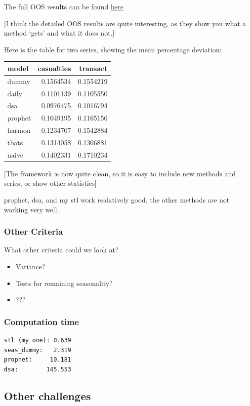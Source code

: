\documentclass[
]{article}
\begin{document}
The full OOS results can be found
\href{https://github.com/christophsax/x13book/blob/master/topics/dailyadj/vignettes/overview.md}{here}

{[}I think the detailed OOS results are quite interesting, as they show
you what a method `gets' and what it does not.{]}

Here is the table for two series, showing the mean percentage deviation:

\begin{longtable}[]{@{}lrr@{}}
\toprule
model & casualties & transact\tabularnewline
\midrule
\endhead
dummy & 0.1564534 & 0.1554219\tabularnewline
daily & 0.1101139 & 0.1105550\tabularnewline
dsa & 0.0976475 & 0.1016794\tabularnewline
prophet & 0.1049195 & 0.1165156\tabularnewline
harmon & 0.1234707 & 0.1542884\tabularnewline
tbats & 0.1314058 & 0.1306881\tabularnewline
naive & 0.1402331 & 0.1710234\tabularnewline
\bottomrule
\end{longtable}

{[}The framework is now quite clean, so it is easy to include new
methods and series, or show other statistics{]}

prophet, dsa, and my stl work realatively good, the other methods are
not working very well.

\hypertarget{other-criteria}{%
\subsubsection{Other Criteria}\label{other-criteria}}

What other criteria could we look at?

\begin{itemize}
\item
  Variance?
\item
  Tests for remaining seasonality?
\item
  ???
\end{itemize}

\hypertarget{computation-time}{%
\subsubsection{Computation time}\label{computation-time}}

\begin{verbatim}
stl (my one): 0.639
seas_dummy:   2.319
prophet:     10.181
dsa:        145.553
\end{verbatim}

\hypertarget{other-challenges}{%
\subsection{Other challenges}\label{other-challenges}}
\end{document}
